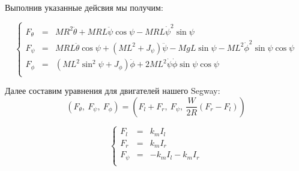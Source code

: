 \documentclass[12pt,a4paper,openany]{extarticle}
\begin{document}
Выполнив указанные дейсвия мы получим:

\begin{equation}
\left\{  
	\begin{array}{rcl}
	F_\theta&=&MR^2\ddot\theta+MRL\ddot\psi\cos\psi-MRL\dot\psi^2\sin\psi\\
	F_\psi&=&MRL\ddot\theta\cos\psi+(ML^2+J_\psi)\ddot\psi-MgL\sin\psi-ML^2\dot\phi^2\sin\psi\cos\psi\\
	F_\phi&=&(ML^2\sin^2\psi+J_\phi)\ddot\phi+2ML^2\dot\psi\dot\phi\sin\psi\cos\psi\\	
	\end{array}   
	\right.
\end{equation}

Далее составим уравнения для двигателей нашего Segway:
\begin{equation}
(F_\theta,\ F_\psi,\ F_\phi)=\left(F_l+F_r,\ F_\psi,\ \frac{W}{2R}(F_r-F_l)\right)
\end{equation}

\begin{equation}
\left\{  
	\begin{array}{rcl}
	F_l&=&k_mI_l\\
	F_r&=&k_mI_r\\
	F_\psi&=&-k_mI_l-k_mI_r\\	
	\end{array}   
	\right.
\end{equation}
\end{document}
